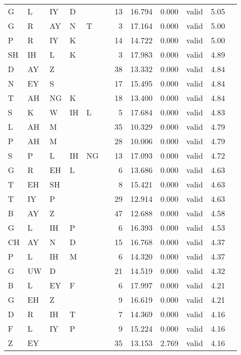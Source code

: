 \begin{longtable}{l@{ } l@{ } l@{ } l@{ } l@{ } l r r r r r r}
G  & L  & IY & D  &    &   & 13 & 16.794 & 0.000 & valid   & 5.05 \\
G  & R  & AY & N  & T  &   &  3 & 17.164 & 0.000 & valid   & 5.00 \\
P  & R  & IY & K  &    &   & 14 & 14.722 & 0.000 & valid   & 5.00 \\
SH & IH & L  & K  &    &   &  3 & 17.983 & 0.000 & valid   & 4.89 \\
D  & AY & Z  &    &    &   & 38 & 13.332 & 0.000 & valid   & 4.84 \\
N  & EY & S  &    &    &   & 17 & 15.495 & 0.000 & valid   & 4.84 \\
T  & AH & NG & K  &    &   & 18 & 13.400 & 0.000 & valid   & 4.84 \\
S  & K  & W  & IH & L  &   &  5 & 17.684 & 0.000 & valid   & 4.83 \\
L  & AH & M  &    &    &   & 35 & 10.329 & 0.000 & valid   & 4.79 \\
P  & AH & M  &    &    &   & 28 & 10.006 & 0.000 & valid   & 4.79 \\
S  & P  & L  & IH & NG &   & 13 & 17.093 & 0.000 & valid   & 4.72 \\
G  & R  & EH & L  &    &   &  6 & 13.686 & 0.000 & valid   & 4.63 \\
T  & EH & SH &    &    &   &  8 & 15.421 & 0.000 & valid   & 4.63 \\
T  & IY & P  &    &    &   & 29 & 12.914 & 0.000 & valid   & 4.63 \\
B  & AY & Z  &    &    &   & 47 & 12.688 & 0.000 & valid   & 4.58 \\
G  & L  & IH & P  &    &   &  6 & 16.393 & 0.000 & valid   & 4.53 \\
CH & AY & N  & D  &    &   & 15 & 16.768 & 0.000 & valid   & 4.37 \\
P  & L  & IH & M  &    &   &  6 & 14.320 & 0.000 & valid   & 4.37 \\
G  & UW & D  &    &    &   & 21 & 14.519 & 0.000 & valid   & 4.32 \\
B  & L  & EY & F  &    &   &  6 & 17.997 & 0.000 & valid   & 4.21 \\
G  & EH & Z  &    &    &   &  9 & 16.619 & 0.000 & valid   & 4.21 \\
D  & R  & IH & T  &    &   &  7 & 14.369 & 0.000 & valid   & 4.16 \\
F  & L  & IY & P  &    &   &  9 & 15.224 & 0.000 & valid   & 4.16 \\
Z  & EY &    &    &    &   & 35 & 13.153 & 2.769 & valid   & 4.16 \\

\end{longtable}
